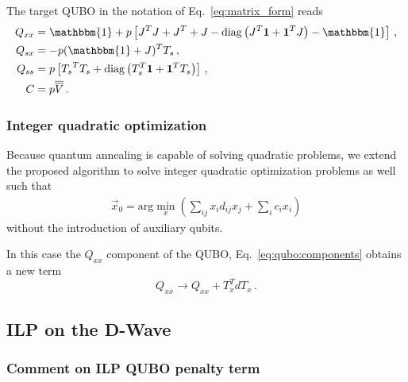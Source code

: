 \documentclass[prd,twocolumn,tightenlines,preprintnumbers,showpacs,superscriptaddress,notitlepage,nofootinbib,eqsecnum,floatfix,longbibliography,aps,10pt]{revtex4-2}
\begin{document}
The target QUBO in the notation of Eq.~\eqref{eq:matrix_form} reads
 {\small
  \begin{align}
   Q_{xx} & = \mathbbm{1} + p\left[J^T J + J^T + J - \mathrm{diag}\left(J^T \vec 1 + \vec 1^T J\right) - \mathbbm{1} \right] \,, \\
   Q_{sx} & = - p(\mathbbm{1}+J)^TT_s\,,                                                                     \\
   Q_{ss} & = p\left[{T_s}^T T_s + \mathrm{diag}\left(T_s^T \vec 1 + \vec 1^T  T_s\right)\right]\,,                                  \\
   C      & =  p \overline{\overline{V}}\,.
  \end{align}}

\subsubsection{Integer quadratic optimization}
\label{sec:methods:ilp:quadratic}

Because quantum annealing is capable of solving quadratic problems, we extend the proposed algorithm to solve integer quadratic optimization problems as well such that
\begin{align}
 \vec x_0 = \mathrm{arg}\min\limits_{x}\left(\sum_{ij} x_i d_{ij} x_j + \sum_i c_i x_i\right)
\end{align}
without the introduction of auxiliary qubits.

In this case the $Q_{xx}$ component of the QUBO, Eq.~\eqref{eq:qubo:components} obtains a new term
\begin{equation}
    Q_{xx} \to Q_{xx} + T_x^T d T_x \, .
\end{equation}

\subsection{ILP on the D-Wave}
\label{sec:methods:ILP-on-D-Wave}

\subsubsection{Comment on ILP QUBO penalty term}
\label{sec:methods:ilp-qubo-comments}
\end{document}
